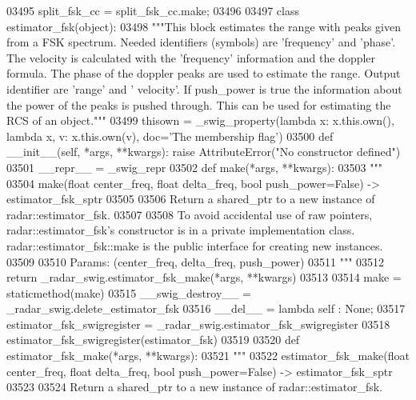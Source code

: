 \begin{DoxyCode}
{{{{{{{{{{{{{03495 split\_fsk\_cc = split\_fsk\_cc.make;
03496 
03497 \textcolor{keyword}{class }estimator_fsk(object):
03498     \textcolor{stringliteral}{"""This block estimates the range with peaks given from a FSK spectrum. Needed identifiers (symbols)
       are 'frequency' and 'phase'. The velocity is calculated with the 'frequency' information and the doppler
       formula. The phase of the doppler peaks are used to estimate the range. Output identifier are 'range' and '
      velocity'. If push\_power is true the information about the power of the peaks is pushed through. This can be used
       for estimating the RCS of an object."""}
03499     thisown = _swig_property(\textcolor{keyword}{lambda} x: x.this.own(), \textcolor{keyword}{lambda} x, v: x.this.own(v), doc=\textcolor{stringliteral}{'The membership flag'})
03500     \textcolor{keyword}{def }__init__(self, *args, **kwargs): \textcolor{keywordflow}{raise} AttributeError(\textcolor{stringliteral}{"No constructor defined"})
03501     \_\_repr\_\_ = \_swig\_repr
03502     \textcolor{keyword}{def }make(*args, **kwargs):
03503         \textcolor{stringliteral}{"""}
03504 \textcolor{stringliteral}{        make(float center\_freq, float delta\_freq, bool push\_power=False) -> estimator\_fsk\_sptr}
03505 \textcolor{stringliteral}{}
03506 \textcolor{stringliteral}{        Return a shared\_ptr to a new instance of radar::estimator\_fsk.}
03507 \textcolor{stringliteral}{}
03508 \textcolor{stringliteral}{        To avoid accidental use of raw pointers, radar::estimator\_fsk's constructor is in a private
       implementation class. radar::estimator\_fsk::make is the public interface for creating new instances.}
03509 \textcolor{stringliteral}{}
03510 \textcolor{stringliteral}{        Params: (center\_freq, delta\_freq, push\_power)}
03511 \textcolor{stringliteral}{        """}
03512         \textcolor{keywordflow}{return} \_radar\_swig.estimator\_fsk\_make(*args, **kwargs)
03513 
03514     make = staticmethod(make)
03515     \_\_swig\_destroy\_\_ = \_radar\_swig.delete\_estimator\_fsk
03516     \_\_del\_\_ = \textcolor{keyword}{lambda} self : \textcolor{keywordtype}{None};
03517 estimator\_fsk\_swigregister = \_radar\_swig.estimator\_fsk\_swigregister
03518 estimator_fsk_swigregister(estimator\_fsk)
03519 
03520 \textcolor{keyword}{def }estimator_fsk_make(*args, **kwargs):
03521   \textcolor{stringliteral}{"""}
03522 \textcolor{stringliteral}{    estimator\_fsk\_make(float center\_freq, float delta\_freq, bool push\_power=False) -> estimator\_fsk\_sptr}
03523 \textcolor{stringliteral}{}
03524 \textcolor{stringliteral}{    Return a shared\_ptr to a new instance of radar::estimator\_fsk.}
}}}}}}}}}}}}}
\end{DoxyCode}
